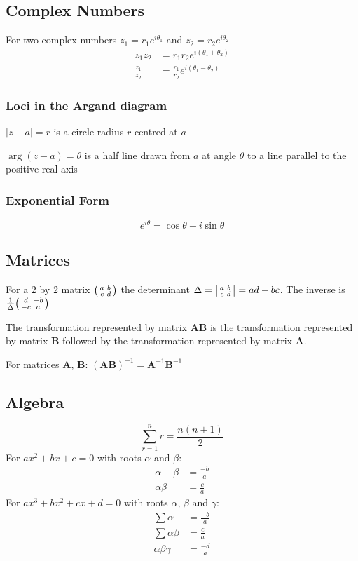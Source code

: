 \subsection{Complex Numbers}
For two complex numbers \(z_1=r_1e^{i\theta_1}\) and \(z_2=r_2e^{i\theta_2}\)
\begin{align*}
z_1z_2 &= r_1r_2e^{i(\theta_1+\theta_2)}\\
\frac{z_1}{z_2}&= \frac{r_1}{r_2} e^{i(\theta_1-\theta_2)}
\end{align*}
\subsubsection{Loci in the Argand diagram}
\(|z-a| = r \) is a circle radius \(r\)  centred at \(a\)
\par
\(\arg(z-a) = \theta \) is a half line drawn from \(a\) at angle \(\theta\) to a
line parallel to the positive real axis
\subsubsection{Exponential Form}
\[          
e^{i\theta}=\cos\theta+i\sin\theta
\]
\subsection{Matrices}
For a $2$ by $2$ matrix
$\begin{psmallmatrix}a & b\\ c & d\end{psmallmatrix}$
the determinant
$ \Delta =  \begin{vsmallmatrix}a & b\\ c & d\end{vsmallmatrix} = ad-bc$. 
The inverse is
$
\frac{1}{\Delta} \begin{psmallmatrix}d & -b\\ -c & a\end{psmallmatrix}
$
\par

The transformation represented by matrix $\mathbf{AB}$ is the transformation
represented by matrix $\mathbf{B}$ followed by the transformation represented by
matrix $\mathbf{A}$.
\par

For matrices $\mathbf{A}$, $\mathbf{B}$: $(\mathbf{AB})^{-1}=\mathbf{A}^{-1}\mathbf{B}^{-1}$
\subsection{Algebra}
\[
    \sum_{r=1}^nr=\frac{n(n+1)}{2}
\]
For $ax^2+bx+c=0$ with roots $\alpha$ and $\beta$:
\begin{align*}
\alpha+\beta &= \frac{-b}{a}\\
\alpha\beta&=\frac{c}{a}
\end{align*}
For $ax^3+bx^2+cx+d=0$ with roots $\alpha$, $\beta$ and $\gamma$:
\begin{align*}
\sum\alpha &= \frac{-b}{a}\\
\sum\alpha\beta&=\frac{c}{a}\\
\alpha\beta\gamma&=\frac{-d}{a}
\end{align*}

